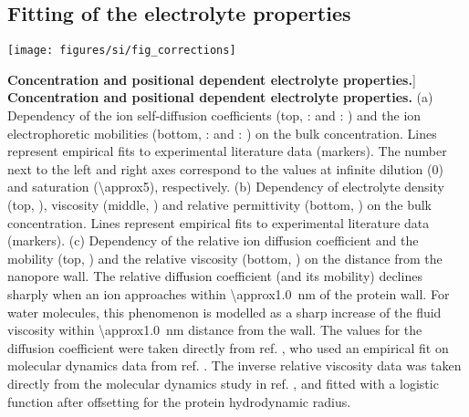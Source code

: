 \documentclass[journal=ancac3, manuscript=suppinfo, etalmode=truncate,maxauthors=0]{achemso}
\begin{document}
\subsection{Fitting of the electrolyte properties}

\begin{figure*}[!b]

  \centering
  \texttt{[image: figures/si/fig\_corrections]}

  \caption%
    [\textbf{Concentration and positional dependent electrolyte properties.}]
    {%
      \textbf{Concentration and positional dependent electrolyte properties.}
      (a)
      Dependency of the ion self-diffusion coefficients (top, \Na{}:  and \Cl{}:
      ) and the ion electrophoretic mobilities (bottom, \Na{}:
       and \Cl{}: ) on the bulk 
      concentration. Lines represent empirical fits to experimental literature data (markers). The number next
      to the left and right axes correspond to the values at infinite dilution (\SI{0}{\Molar}) and saturation
      (\SI{\approx5}{\Molar}), respectively.
      (b)
      Dependency of electrolyte density (top, ), viscosity (middle,
      ) and relative permittivity (bottom, ) on
      the bulk  concentration. Lines represent empirical fits to experimental literature data
      (markers).
      (c)
      Dependency of the relative ion diffusion coefficient and the mobility (top,
      ) and the relative viscosity (bottom, ) on
      the distance from the nanopore wall. The relative diffusion coefficient (and its mobility) declines
      sharply when an ion approaches within \SI{\approx1.0}{\nm} of the protein wall. For water molecules,
      this phenomenon is modelled as a sharp increase of the fluid viscosity within \SI{\approx1.0}{\nm}
      distance from the wall. The values for the diffusion coefficient were taken directly from ref.
      , who used an empirical fit on molecular dynamics data from ref.
      . The inverse relative viscosity data was taken directly from the molecular
      dynamics study in ref. , and fitted with a logistic function after offsetting for
      the protein hydrodynamic radius.
  }\label{fig:corrections}
\end{figure*}
\end{document}
